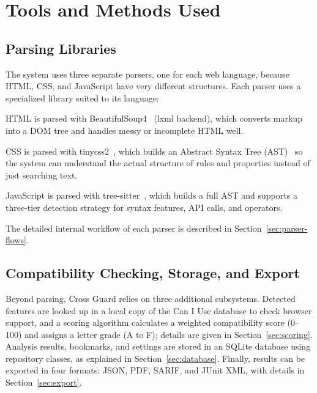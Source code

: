 \section{Tools and Methods Used}
\label{sec:tools-methods}

\subsection{Parsing Libraries}

The system uses three separate parsers, one for each web language, because HTML, CSS, and JavaScript have very different structures. Each parser uses a specialized library suited to its language:

\begin{compactitem}
    \item HTML is parsed with BeautifulSoup4~\cite{bs4docs} (lxml backend), which converts markup into a DOM tree and handles messy or incomplete HTML well.
    \item CSS is parsed with tinycss2~\cite{tinycss2}, which builds an Abstract Syntax Tree (AST)~\cite{aho2006compilers} so the system can understand the actual structure of rules and properties instead of just searching text.
    \item JavaScript is parsed with tree-sitter~\cite{treesitter}, which builds a full AST and supports a three-tier detection strategy for syntax features, API calls, and operators.
\end{compactitem}

The detailed internal workflow of each parser is described in Section~\ref{sec:parser-flows}.

\subsection{Compatibility Checking, Storage, and Export}

Beyond parsing, Cross Guard relies on three additional subsystems. Detected features are looked up in a local copy of the Can I Use database to check browser support, and a scoring algorithm calculates a weighted compatibility score (0--100) and assigns a letter grade (A to F); details are given in Section~\ref{sec:scoring}. Analysis results, bookmarks, and settings are stored in an SQLite database using repository classes, as explained in Section~\ref{sec:database}. Finally, results can be exported in four formats: JSON, PDF, SARIF, and JUnit XML, with details in Section~\ref{sec:export}.

